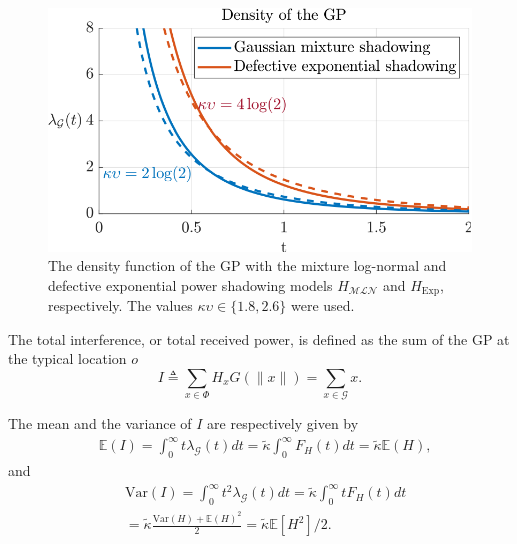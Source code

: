 \documentclass[lettersize,journal]{IEEEtran}
\begin{document}
         \begin{figure}[h]
           \centering
           \includegraphics[width=\linewidth]{plotdensities.pdf}
           \caption{The density function of the GP with the mixture log-normal and defective exponential power shadowing models $H_{\mathcal{MLN}}$ and $H_{\text{Exp}}$, respectively. The values $\kappa \upsilon \in \{1.8,2.6\}$ were used. } 
           \label{fig:plotdensities}
         \end{figure}



The total interference, or total received power, is defined as the sum of the GP at the typical location $\textit{o}$ 
\begin{equation}
  \label{eq:totpow}
  I \triangleq \sum_{x \in \Phi} H_x G(\|x\|) = \sum_{x \in \mathcal{G}} x.
\end{equation}


The mean and the variance of $I$ are respectively given by
\begin{align}
  \label{eq:totmean}
  &\mathbb{E}\left(I \right) = \int_{0}^{\infty} t\lambda_{\mathcal{G}}(t) dt = \tilde{\kappa} \int_{0}^{\infty}F_H(t) dt =\tilde{\kappa} \mathbb{E}(H),
\end{align}
and
\begin{align}
  \label{eq:totvar}
  &\text{Var}\left(I \right) = \int_{0}^{\infty} t^2\lambda_{\mathcal{G}}(t) dt= \tilde{\kappa} \int_0^{\infty}tF_H(t) dt  \nonumber \\
  &= \tilde{\kappa} \frac{\text{Var}(H) + \mathbb{E}(H)^2}{2} = \tilde{\kappa}  \mathbb{E}[H^2]/2.
\end{align}


\end{document}
